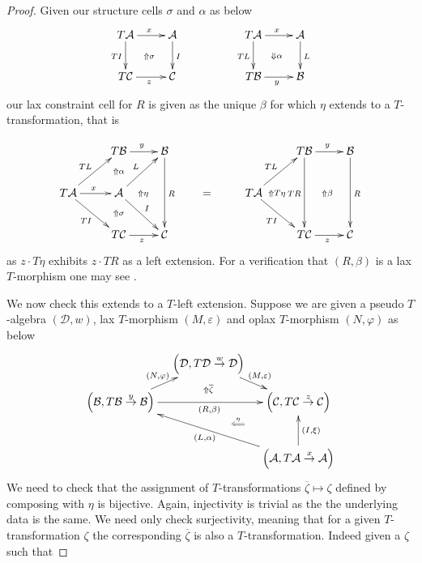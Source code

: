 \documentclass[a4paper,oneside,english]{amsart}
\numberwithin{equation}{section}
\numberwithin{figure}{section}
\theoremstyle{plain}
\theoremstyle{definition}
\theoremstyle{remark}
\theoremstyle{definition}
\theoremstyle{plain}
\theoremstyle{plain}
\theoremstyle{plain}
\begin{document}
\begin{proof}
Given our structure cells $\sigma$ and $\alpha$ as below
\[
\xymatrix{T\mathcal{A}\ar[d]_{TI}\ar[r]^{x}\ar@{}[rd]|-{\Uparrow\sigma} & \mathcal{A}\ar[d]^{I} &  & T\mathcal{A}\ar[d]_{TL}\ar[r]^{x}\ar@{}[rd]|-{\Downarrow\alpha} & \mathcal{A}\ar[d]^{L}\\
T\mathcal{C}\ar[r]_{z} & \mathcal{C} &  & T\mathcal{B}\ar[r]_{y} & \mathcal{B}
}
\]
 our lax constraint cell for $R$ is given as the unique $\beta$
for which $\eta$ extends to a $T$-transformation, that is

\[
\xymatrix{ & T\mathcal{B}\ar[r]^{y} & \mathcal{B}\ar[dd]^{R} &  &  & T\mathcal{B}\ar[r]^{y}\ar[dd]_{TR} & \mathcal{B}\ar[dd]^{R}\\
T\mathcal{A}\ar[ru]^{TL}\ar[r]^{x}\ar[rd]_{TI} & \mathcal{A}\ar[dr]^{I}\ar[ur]^{L}\ar@{}[r]|-{\Uparrow\eta}\ar@{}[u]|-{\Uparrow\alpha}\ar@{}[d]|-{\Uparrow\sigma} & \; & = & T\mathcal{A}\ar[ru]^{TL}\ar[rd]_{TI}\ar@{}[r]|-{\Uparrow T\eta\quad} & \;\ar@{}[r]|-{\Uparrow\beta} & \;\\
 & T\mathcal{C}\ar[r]_{z} & \mathcal{C} &  &  & T\mathcal{C}\ar[r]_{z} & \mathcal{C}
}
\]
as $z\cdot T\eta$ exhibits $z\cdot TR$ as a left extension. For
a verification that $\left(R,\beta\right)$ is a lax $T$-morphism
one may see \cite[Theorem 2.44]{markextension}.

We now check this extends to a $T$-left extension. Suppose we are
given a pseudo $T$-algebra $\left(\mathcal{D},w\right)$, lax $T$-morphism
$\left(M,{\varepsilon}\right)$ and oplax $T$-morphism $\left(N,\varphi\right)$
as below
\[
\xymatrix@=1em{ & \left(\mathcal{D},T\mathcal{D}\overset{w}{\rightarrow}\mathcal{D}\right)\ar[rd]^{\left(M,{\varepsilon}\right)}\\
\left(\mathcal{B},T\mathcal{B}\overset{y}{\rightarrow}\mathcal{B}\right)\ar[rr]_{\left(R,\beta\right)}\ar[ur]^{\left(N,\varphi\right)} & \;\ar@{}[u]|-{\Uparrow\overline{\zeta}} & \left(\mathcal{C},T\mathcal{C}\overset{z}{\rightarrow}\mathcal{C}\right)\ar@{}[ld]|-{\stackrel{\eta}{\Longleftarrow}}\\
 & \;\\
 &  & \left(\mathcal{A},T\mathcal{A}\overset{x}{\rightarrow}\mathcal{A}\right)\ar[uu]_{\left(I,\xi\right)}\ar[uull]^{\left(L,\alpha\right)}
}
\]
We need to check that the assignment of $T$-transformations $\overline{\zeta}\mapsto\zeta$
defined by composing with $\eta$ is bijective. Again, injectivity
is trivial as the the underlying data is the same. We need only check
surjectivity, meaning that for a given $T$-transformation $\zeta$
the corresponding $\overline{\zeta}$ is also a $T$-transformation.
Indeed given a $\zeta$ such that


\end{proof}
\end{document}
